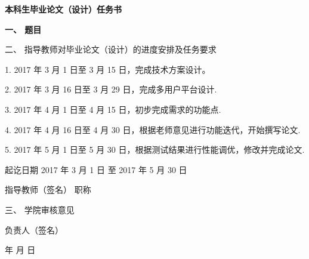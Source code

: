 {
  \setlength{\parindent}{0em}
  \linespread{1}

  \vspace*{-2.2em}

  {
    \centering
    \songti\erhao\bfseries
    本科生毕业论文（设计）任务书 \par
  }

  \vspace{2.1em}

  {
    \renewcommand\arraystretch{1.7}
    \songti\xiaosi\bfseries
    一、 \; 题目 \; \underline{\makebox{\zjutitlec}}

    \vspace{1.1em}

    二、 \; 指导教师对毕业论文（设计）的进度安排及任务要求
    {

      \vspace{0.5em}
      \songti\xiaosi\mdseries

      1. 2017 年 3 月 1 日至 3 月 15 日，完成技术方案设计。

      2. 2017 年 3 月 16 日至 3 月 29 日，完成多用户平台设计.

      3. 2017 年 4 月 1 日至 4 月 15 日，初步完成需求的功能点.

      4. 2017 年 4 月 16 日至 4 月 30 日，根据老师意见进行功能迭代，开始撰写论文.

      5. 2017 年 5 月 1 日至 5 月 30 日，根据测试结果进行性能调优，修改并完成论文.
    }
    \vspace{2em}

    \hfill 起讫日期 \hspace{1em} 2017 年 \hspace{0.5em} 3 月 \hspace{0.5em} 1 日 \; 至 \hspace{0.5em} 2017 年 \hspace{0.5em} 5 月 \hspace{0.5em} 30 日

    \vspace{1.3em}

    \hfill 指导教师（签名） \; \underline{\hspace{4em}} \; 职称 \; \underline{\hspace{4em}}

    \vspace{2.35em}

    三、 \; 学院审核意见

    \vspace{13.95em}

    \hfill 负责人（签名） \; \underline{\hspace{4em}}

    \vspace{1.3em}

    \hfill \hspace{2em} 年 \hspace{1em} 月 \hspace{1em} 日 \par
  }
}
